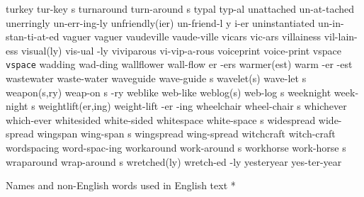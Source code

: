\5 turkey		tur-key s
\5 turnaround		turn-around s
\1 typal		typ-al
\1 unattached		un-at-tached
\1 unerringly		un-err-ing-ly
\3 unfriendly(ier)	un-friend-l y i-er
\NewWordtrue
\1 uninstantiated	un-in-stan-ti-at-ed	%
\1 vaguer		vaguer
\1 vaudeville		vaude-ville
\1 vicars		vic-ars
\1 villainess		vil-lain-ess
\2 visual(ly)		vis-ual -ly		%
\1 viviparous		vi-vip-a-rous
\1 voiceprint		voice-print
\1 vspace 		{\tt\bs vspace}
\1 wadding		wad-ding
\6 wallflower		wall-flow er -ers
\3 warmer(est)		warm -er -est		%
\1 wastewater		waste-water
\5 waveguide		wave-guide s
\2 wavelet(s)		wave-let s
\3 weapon(s,ry)		weap-on s -ry		%
\1 weblike		web-like
\2 weblog(s)		web-log s		%
\5 weeknight		week-night s
\3 weightlift(er,ing)	weight-lift -er -ing	%
\5 wheelchair		wheel-chair s
\1 whichever		which-ever
\1 whitesided		white-sided
\5 whitespace		white-space s
\1 widespread		wide-spread
\5 wingspan		wing-span s	%
\1 wingspread		wing-spread
\1 witchcraft		witch-craft
\1 wordspacing		word-spac-ing
\5 workaround		work-around s		%
\5 workhorse		work-horse s
\5 wraparound		wrap-around s		%
\2 wretched(ly)		wretch-ed -ly
\1 yesteryear		yes-ter-year
\endgraf
\endgroup

\head * Names and non-English words \break used in English text *

